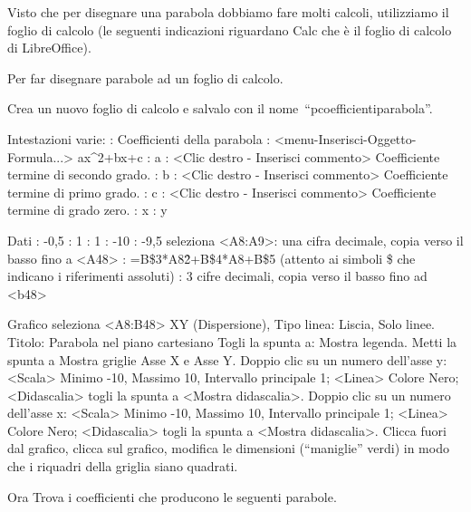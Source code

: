 Visto che per disegnare una parabola dobbiamo fare molti calcoli, utilizziamo 
il foglio di calcolo (le seguenti indicazioni riguardano Calc che è il foglio
di calcolo di LibreOffice).

\begin{procedura}
 Per far disegnare parabole ad un foglio di calcolo.
 \begin{enumerate*}
  \item Crea un nuovo foglio di calcolo e salvalo con il 
   nome~``pcoefficientiparabola''.
  \item Intestazioni varie:
   : Coefficienti della parabola
   : <menu-Inserisci-Oggetto-Formula...> ax\^{}2+bx+c
   : a
   : <Clic destro - Inserisci commento> Coefficiente termine di 
    secondo grado.
   : b
   : <Clic destro - Inserisci commento> Coefficiente termine di 
    primo grado.
   : c
   : <Clic destro - Inserisci commento> Coefficiente termine di 
    grado zero.
   : x
   : y
  \item Dati
   : -0,5
   : 1
   : 1
   : -10
   : -9,5
   \subitem seleziona <A8:A9>: una cifra decimale, 
    copia verso il basso fino a <A48>
   : =B\$3*A8\^2+B\$4*A8+B\$5 (attento ai simboli \$ che indicano i
    riferimenti assoluti)
   : 3 cifre decimali, copia verso il basso fino ad <b48>
  \item Grafico
   \subitem seleziona <A8:B48>
   \subitem XY (Dispersione), Tipo linea: Liscia, Solo linee.
   \subitem Titolo: Parabola nel piano cartesiano
   \subitem Togli la spunta a: Mostra legenda.
   \subitem Metti la spunta a Mostra griglie Asse X e Asse Y.
   \subitem Doppio clic su un numero dell'asse y: 
    <Scala> Minimo -10, Massimo 10, Intervallo principale 1;
    <Linea> Colore Nero;
    <Didascalia> togli la spunta a <Mostra didascalia>.
   \subitem Doppio clic su un numero dell'asse x: 
    <Scala> Minimo -10, Massimo 10, Intervallo principale 1;
    <Linea> Colore Nero;
    <Didascalia> togli la spunta a <Mostra didascalia>.
   \subitem Clicca fuori dal grafico, clicca sul grafico, modifica le 
    dimensioni (``maniglie'' verdi) in modo che i riquadri della griglia 
    siano quadrati.
 \end{enumerate*}
\end{procedura}

Ora Trova i coefficienti che producono le seguenti parabole.

